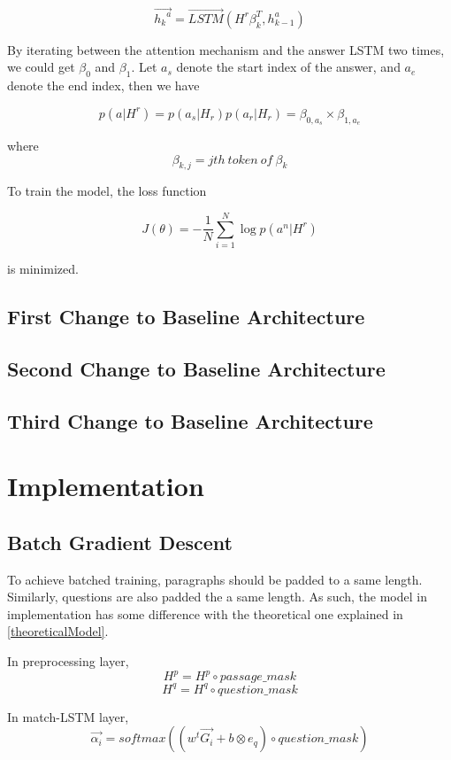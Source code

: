 \documentclass[modernstyle,12pt]{sjsuthesis}
\theoremstyle{definition}
\begin{document}
$$\overrightarrow{{h_k}^a} = \overrightarrow{LSTM}(H^r\beta _k^T, h_{k-1}^a)$$

By iterating between the attention mechanism and the answer LSTM two times, we could get $\beta _0$ and $\beta _1$. Let $a_s$ denote the start index of the answer, and $a_e$ denote the end index, then we have

$$p(a|H^r) = p(a_s|H_r)p(a_r|H_r)=\beta _{0, a_s} \times \beta_{1, a_e}$$

where $$\beta_{k, j} = jth\ token\ of\ \beta _k$$

To train the model, the loss function

$$J(\theta) = -\frac{1}{N}\sum_{i=1}^{N} \log{p(a^n|H^r)} $$

is minimized.

\section{First Change to Baseline Architecture}

\section{Second Change to Baseline Architecture}

\section{Third Change to Baseline Architecture}

\chapter{Implementation}

\section{Batch Gradient Descent}

To achieve batched training, paragraphs should be padded to a same length. Similarly, questions are also padded the a same length. As such, the model in implementation has some difference with the theoretical one explained in \ref{theoreticalModel}.

In preprocessing layer,
$$H^p = H^p \circ passage\_mask$$
$$H^q = H^q \circ question\_mask$$

In match-LSTM layer,
$$\overrightarrow{\alpha _i} = softmax( (w^t\overrightarrow{G_i} + b \otimes e_q) \circ question\_mask)$$
\end{document}
